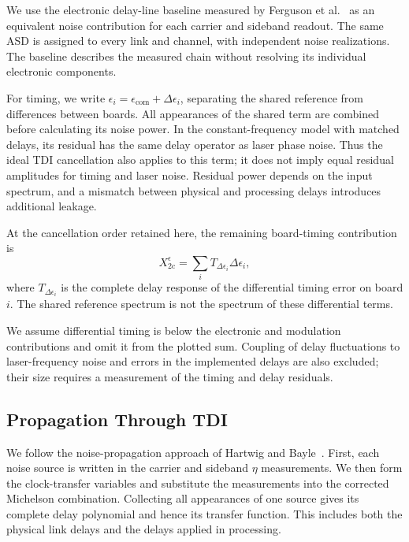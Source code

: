 We use the electronic delay-line baseline measured by Ferguson et al.~\cite{ferguson2025applying} as an equivalent noise contribution for each carrier and sideband readout. The same ASD is assigned to every link and channel, with independent noise realizations. The baseline describes the measured chain without resolving its individual electronic components.

For timing, we write $\epsilon_i=\epsilon_{\mathrm{com}}+\Delta\epsilon_i$, separating the shared reference from differences between boards. All appearances of the shared term are combined before calculating its noise power. In the constant-frequency model with matched delays, its residual has the same delay operator as laser phase noise. Thus the ideal TDI cancellation also applies to this term; it does not imply equal residual amplitudes for timing and laser noise. Residual power depends on the input spectrum, and a mismatch between physical and processing delays introduces additional leakage.

At the cancellation order retained here, the remaining board-timing contribution is
\begin{equation}
 X_{2\mathrm c}^{\epsilon}=\sum_i T_{\Delta\epsilon_i}\Delta\epsilon_i,
\end{equation}
where $T_{\Delta\epsilon_i}$ is the complete delay response of the differential timing error on board $i$. The shared reference spectrum is not the spectrum of these differential terms.

We assume differential timing is below the electronic and modulation contributions and omit it from the plotted sum. Coupling of delay fluctuations to laser-frequency noise and errors in the implemented delays are also excluded; their size requires a measurement of the timing and delay residuals.



\subsection{Propagation Through TDI}
\label{sec:noise_propagation}
We follow the noise-propagation approach of Hartwig and Bayle~\cite{hartwig_clock-jitter_2021}. First, each noise source is written in the carrier and sideband $\eta$ measurements. We then form the clock-transfer variables and substitute the measurements into the corrected Michelson combination. Collecting all appearances of one source gives its complete delay polynomial and hence its transfer function. This includes both the physical link delays and the delays applied in processing.

